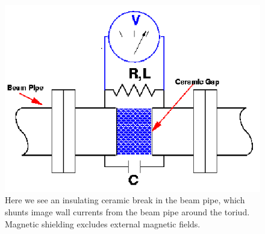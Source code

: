 \begin{figure}
\begin{center}
\includegraphics[width=0.75\linewidth]{../DataStreams/figs/wcm_schematic_cartoon}
\caption{ Here we see an insulating ceramic break in the beam pipe, which shunts image
wall currents from the beam pipe around the toriud. Magnetic shielding excludes external
magnetic fields.~\cite{kawallfocus2005} }
\label{fig:wcm_schematic_cartoon}
\end{center}
\end{figure}
